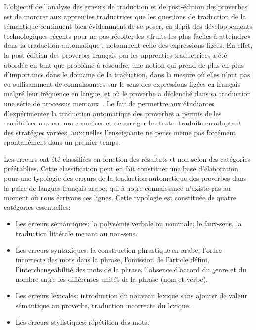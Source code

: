 \documentclass[french]{textolivre}
\begin{document}
L’objectif de l’analyse des erreurs de traduction et de post-édition des proverbes est de montrer aux apprenties 
traductrices que les questions de traduction de la sémantique continuent bien évidemment de se poser, en dépit 
des développements technologiques récents pour ne pas récolter les «fruits les plus faciles à atteindre» dans 
la traduction automatique \cite{poibeau_traduire_2016}, notamment celle des expressions figées. En effet, la 
post-édition des proverbes français par les apprenties traductrices a été abordée en tant que problème à résoudre, 
une notion qui prend de plus en plus d’importance dans le domaine de la traduction, dans la mesure où elles n’ont 
pas eu suffisamment de connaissances sur le sens des expressions figées en français malgré leur fréquence en langue, 
et où le proverbe a déclenché dans sa traduction une série de processus mentaux \cite{gil-bardaji_resolution_2010}. 
Le fait de permettre aux étudiantes d’expérimenter la traduction automatique des proverbes a permis de les sensibiliser 
aux erreurs commises et de corriger les textes traduits en adoptant des stratégies variées, auxquelles l’enseignante 
ne pense même pas forcément spontanément dans un premier temps.

Les erreurs ont été classifiées en fonction des résultats et non selon des catégories préétablies. Cette classification 
peut en fait constituer une base d’élaboration pour une typologie des erreurs de la traduction automatique des proverbes 
dans la paire de langues français-arabe, qui à notre connaissance n’existe pas au moment où nous écrivons ces lignes. 
Cette typologie est constituée de quatre catégories essentielles:

\begin{itemize}
    \item Les erreurs sémantiques: la polysémie verbale ou nominale, le faux-sens, la traduction littérale menant au non-sens.
    \item Les erreurs syntaxiques: la construction phrastique en arabe, l’ordre incorrecte des mots dans la phrase, l’omission de l’article défini, l’interchangeabilité des mots de la phrase, l’absence d’accord du genre et du nombre entre les différentes unités de la phrase (nom et verbe).
    \item Les erreurs lexicales: introduction du nouveau lexique sans ajouter de valeur sémantique au proverbe, traduction incorrecte du lexique.
    \item Les erreurs stylistiques: répétition des mots.
\end{itemize}
\end{document}
